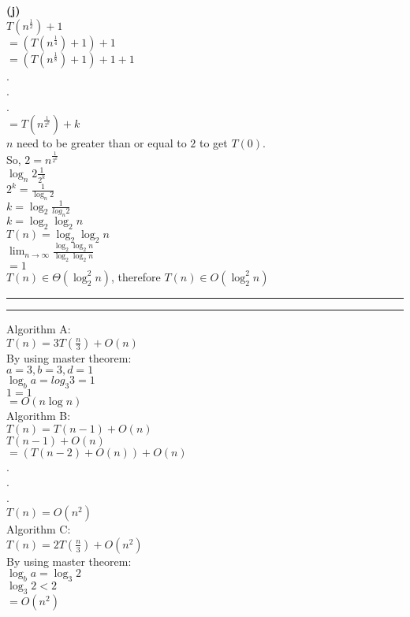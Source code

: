 \documentclass[a4paper, 11pt]{article}
\newcommand{\question}[2] {\vspace{.25in} \hrule\vspace{0.5em}
\noindent{\bf #1: #2} \vspace{0.5em}
\hrule \vspace{.10in}}
\renewcommand{\part}[1] {\vspace{.10in} {\bf (#1)}}
\begin{document}
\part{j}\\
$T(n^{\frac{1}{2}})+1$\\
$=(T(n^{\frac{1}{4}})+1)+1$\\
$=(T(n^{\frac{1}{8}})+1)+1+1$\\
.\\
.\\
.\\
$=T(n^{\frac{1}{2^{k}}})+k$\\
$n$ need to be greater than or equal to $2$ to get $T(0)$.\\
So, $2 = n^{\frac{1}{2^{k}}}$\\
$\log_{n} 2 \frac{1}{2^{k}}$\\
$2^{k} = \frac{1}{\log_{n} 2}$\\
$k = \log_2 \frac{1}{log_{n} 2}$\\
$k = \log_2\log_2 n$\\
$T(n)=\log_2\log_2 n$\\
$\lim_{n\to\infty} \frac{\log_2\log_2 n}{\log_2\log_2 n}$\\
$=1$\\
$T(n)\in\Theta(\log_2^{2} n)$, therefore $T(n)\in O(\log_2^{2} n)$
\question{2}{Part2}
Algorithm A:\\
$T(n)=3T(\frac{n}{3})+O(n)$\\
By using master theorem:\\
$a=3, b=3, d=1$\\
$\log_{b} a = log_3 3 = 1$\\
$1=1$\\
$=O(n\log n)$\\
Algorithm B:\\
$T(n) = T(n-1)+O(n)$\\
$T(n-1)+O(n)$\\
$=(T(n-2)+O(n))+O(n)$\\
.\\
.\\
.\\
$T(n)=O(n^{2})$\\
Algorithm C:\\
$T(n)=2T(\frac{n}{3})+O(n^{2})$\\
By using master theorem:\\
$\log_{b} a = \log_{3} 2$\\
$\log_{3} 2 < 2$\\
$=O(n^{2})$\\
\end{document}
